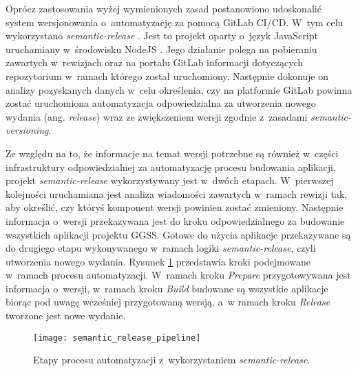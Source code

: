 Oprócz zastosowania wyżej wymienionych zasad postanowiono udoskonalić system wersjonowania o~automatyzację za pomocą GitLab CI/CD. W~tym celu wykorzystano \emph{semantic-release} \cite{semantic_release}. Jest to projekt oparty o~język JavaScript \cite{javascript} uruchamiany w~środowisku NodeJS \cite{nodejs}. Jego działanie polega na pobieraniu zawartych w~rewizjach oraz na portalu GitLab informacji dotyczących repozytorium w~ramach którego został uruchomiony. Następnie dokonuje on analizy pozyskanych danych w~celu określenia, czy na platformie GitLab powinna zostać uruchomiona automatyzacja odpowiedzialna za utworzenia nowego wydania (ang. \emph{release}) wraz ze zwiększeniem wersji zgodnie z~zasadami \emph{semantic-versioning}.

Ze względu na to, że informacje na temat wersji potrzebne są również w~części infrastruktury odpowiedzialnej za automatyzację procesu budowania aplikacji, projekt \emph{semantic-release} wykorzystywany jest w~dwóch etapach. W~pierwszej kolejności uruchamiana jest analiza wiadomości zawartych w~ramach rewizji tak, aby określić, czy któryś komponent wersji powinien zostać zmieniony. Następnie informacja o~wersji przekazywana jest do kroku odpowiedzialnego za budowanie wszystkich aplikacji projektu GGSS. Gotowe do użycia aplikacje przekazywane są do drugiego etapu wykonywanego w~ramach logiki \emph{semantic-release}, czyli utworzenia nowego wydania. Rysunek \ref{fig:semantic_pipeline} przedstawia kroki podejmowane w~ramach procesu automatyzacji. W~ramach kroku \emph{Prepare} przygotowywana jest informacja o~wersji, w~ramach kroku \emph{Build} budowane są wszystkie aplikacje biorąc pod uwagę wcześniej przygotowaną wersją, a~w ramach kroku \emph{Release} tworzone jest nowe wydanie.

\begin{figure}[H]
    \centering
    \texttt{[image: semantic\_release\_pipeline]}
    \caption{Etapy procesu automatyzacji z~wykorzystaniem \emph{semantic-release}.}
    \label{fig:semantic_pipeline}
\end{figure}

